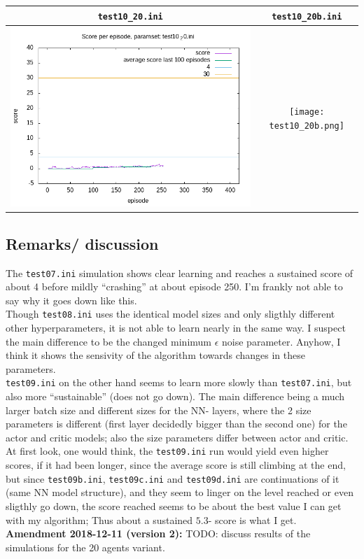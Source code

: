 \documentclass[a4paper]{article}
\begin{document}
\begin{tabular}{ |c|c| }
  \hline
  \texttt{test10\_20.ini} & \texttt{test10\_20b.ini} \\
  \hline
  \includegraphics[scale=0.35]{test10_20.png} & \texttt{[image: test10\_20b.png]} \\
  \hline
\end{tabular}

\subsection{Remarks/ discussion}
The \texttt{test07.ini} simulation shows clear learning and reaches a sustained
score of about 4 before mildly \enquote{crashing} at about episode 250. I'm frankly
not able to say why it goes down like this.
\\
Though \texttt{test08.ini} uses the identical model sizes and only sligthly
different other hyperparameters, it is not able to learn nearly in the same
way. I suspect the main difference to be the changed minimum $\epsilon$ noise
parameter. Anyhow, I think it shows the sensivity of the algorithm towards
changes in these parameters.
\\
\texttt{test09.ini} on the other hand seems to learn more slowly than
\texttt{test07.ini}, but also more \enquote{sustainable} (does not go down).
The main difference being a much larger batch size and different sizes for
the NN- layers, where the 2 size parameters is different (first layer decidedly
bigger than the second one) for the actor and critic models; also the
size parameters differ between actor and critic.
\\
At first look, one would think, the \texttt{test09.ini} run would yield even
higher scores, if it had been longer, since the average score is still climbing
at the end, but since \texttt{test09b.ini}, \texttt{test09c.ini} and
\texttt{test09d.ini} are continuations of it (same NN model structure), and they
seem to linger on the level reached or even sligthly go down, the score
reached seems to be about the best value I can get with my algorithm;
Thus about a sustained $5.3$- score is what I get.
\\
\textbf{Amendment 2018-12-11 (version 2):} TODO: discuss results
of the simulations for the 20 agents variant.
\end{document}
